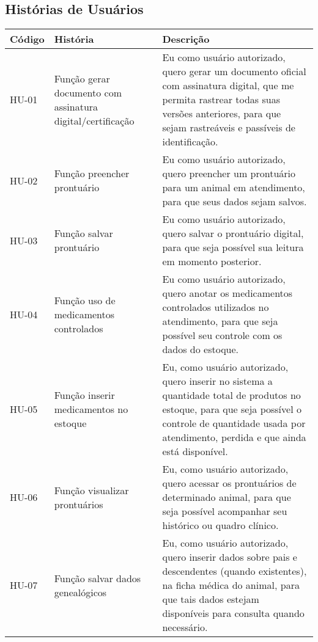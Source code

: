 \documentclass[
    12pt,               %
    openright,          %
    oneside,
    a4paper,            %
    MODELO,             %
    TODO,               %
    english,            %
    brazil              %
    ]{ifsp-spo-inf-ctds}
\begin{document}

        \subsection{Histórias de Usuários}
    
    \begin{center}
        \begin{table}[H]
        \centering
        \begin{tabulary}{1.0\textwidth}{|p{5em}|p{8em}|p{18em}|}
        \hline
        Código & História & Descrição\\
        \hline
        HU-01 & Função gerar documento com assinatura digital/certificação & Eu como usuário autorizado, quero gerar um documento oficial com assinatura digital, que me permita rastrear todas suas versões anteriores, para que sejam rastreáveis e passíveis de identificação.\\
        \hline
        HU-02 & Função preencher prontuário & Eu como usuário autorizado, quero preencher um prontuário para um animal em atendimento, para que seus dados sejam salvos.\\
        \hline
        HU-03 & Função salvar prontuário & Eu como usuário autorizado, quero salvar o prontuário digital, para que seja possível sua leitura em momento posterior.\\
        \hline
        HU-04 & Função uso de medicamentos controlados & Eu como usuário autorizado, quero anotar os medicamentos controlados utilizados no atendimento, para que seja possível seu controle com os dados do estoque.\\
        \hline
        HU-05 & Função inserir medicamentos no estoque & Eu, como usuário autorizado, quero inserir no sistema a quantidade total de produtos no estoque, para que seja possível o controle de quantidade usada por atendimento, perdida e que ainda está disponível.\\
        \hline
        HU-06 & Função visualizar prontuários & Eu, como usuário autorizado, quero acessar os prontuários de determinado animal, para que seja possível acompanhar seu histórico ou quadro clínico.\\
        \hline
        HU-07 & Função salvar dados genealógicos &  Eu, como usuário autorizado, quero inserir dados sobre pais e descendentes (quando existentes), na ficha médica do animal, para que tais dados estejam disponíveis para consulta quando necessário.\\

\end{tabulary}
\end{table}
\end{center}
\end{document}
